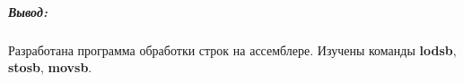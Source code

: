 \subparagraph{Вывод:}
Разработана программа обработки строк на ассемблере.
Изучены команды \textbf{lodsb}, \textbf{stosb}, \textbf{movsb}.